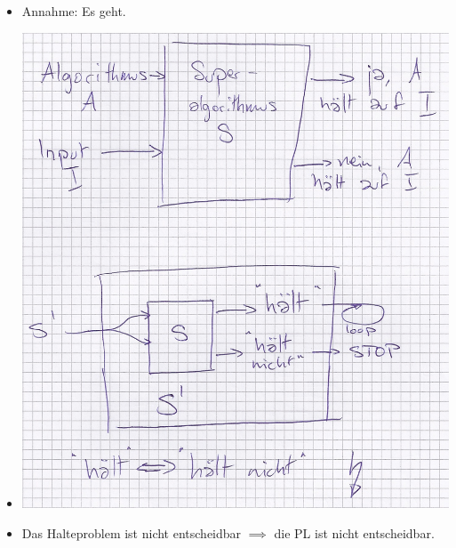 \begin{itemize}
	\item Annahme: Es geht.
	\item \includegraphics[width=\textwidth]{Bild14}
	\item Das Halteproblem ist nicht entscheidbar $\implies$ die PL ist nicht entscheidbar.
\end{itemize}

